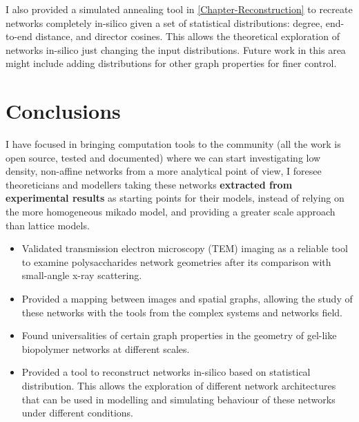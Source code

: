 I also provided a simulated annealing tool in \autoref{Chapter-Reconstruction} to recreate networks completely in-silico given a set of statistical distributions: degree, end-to-end distance, and director cosines. This allows the theoretical exploration of networks in-silico just changing the input distributions. Future work in this area might include adding distributions for other graph properties for finer control.

\section{Conclusions}%
\label{sub:conclusions_conclusions}

I have focused in bringing computation tools to the community (all the work is open source, tested and documented) where we can start investigating low density, non-affine networks from a more analytical point of view, I foresee theoreticians and modellers taking these networks \textbf{extracted from experimental results} as starting points for their models, instead of relying on the more homogeneous mikado model, and providing a greater scale approach than lattice models.

\begin{itemize}[topsep=0pt]
  \item Validated transmission electron microscopy (TEM) imaging as a reliable tool to examine polysaccharides network geometries after its comparison with small-angle x-ray scattering.
  \item Provided a mapping between images and spatial graphs, allowing the study of these networks with the tools from the complex systems and networks field.
  \item Found universalities of certain graph properties in the geometry of gel-like biopolymer networks at different scales.
  \item Provided a tool to reconstruct networks in-silico based on statistical distribution. This allows the exploration of different network architectures that can be used in modelling and simulating behaviour of these networks under different conditions.
\end{itemize}

